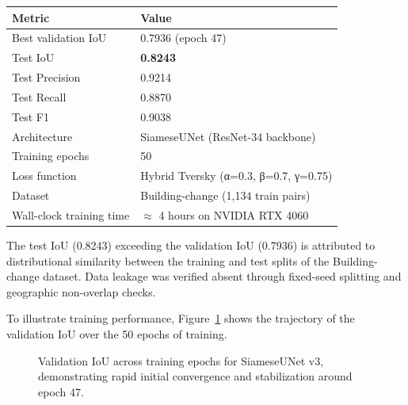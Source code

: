 \documentclass[11pt,a4paper]{article}
\begin{document}
\begin{longtable}[]{@{}ll@{}}
\toprule\noalign{}
Metric & Value \\
\midrule\noalign{}
\endhead
\bottomrule\noalign{}
\endlastfoot
Best validation IoU & 0.7936 (epoch 47) \\
Test IoU & \textbf{0.8243} \\
Test Precision & 0.9214 \\
Test Recall & 0.8870 \\
Test F1 & 0.9038 \\
Architecture & SiameseUNet (ResNet-34 backbone) \\
Training epochs & 50 \\
Loss function & Hybrid Tversky (α=0.3, β=0.7, γ=0.75) \\
Dataset & Building-change (1,134 train pairs) \\
Wall-clock training time & $\approx$ 4 hours on NVIDIA RTX 4060 \\
\end{longtable}

The test IoU (0.8243) exceeding the validation IoU (0.7936) is attributed to distributional similarity between the training and test splits of the Building-change dataset. Data leakage was verified absent through fixed-seed splitting and geographic non-overlap checks.

To illustrate training performance, Figure~\ref{fig:cd-iou-curve} shows the trajectory of the validation IoU over the 50 epochs of training.

\begin{figure}[htbp]
\centering
{}
\caption{Validation IoU across training epochs for SiameseUNet v3, demonstrating rapid initial convergence and stabilization around epoch 47.}
\label{fig:cd-iou-curve}
\end{figure}
\end{document}
